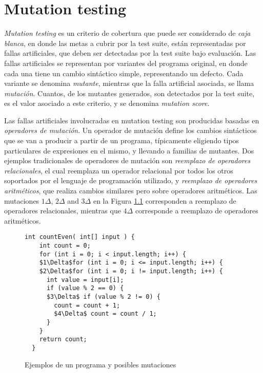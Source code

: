 \chapter[Mutation]{Mutation testing}
\label{cap:preliminares.mutation}

\emph{Mutation testing} es un criterio de cobertura que puede ser considerado de \emph{caja blanca}, en donde las metas a cubrir por la test suite, est\'an representadas por fallas artificiales, que deben ser detectadas por la test suite bajo evaluaci\'on. Las fallas artificiales se representan por variantes del programa original, en donde cada una tiene un cambio sint\'actico simple, representando un defecto. Cada variante se denomina \emph{mutante}, mientras que la falla artificial asociada, se llama \emph{mutaci\'on}. Cuantos, de los mutantes generados, son detectados por la test suite, es el valor asociado a este criterio, y se denomina \emph{mutation score}.

Las fallas artificiales involucradas en mutation testing son producidas basadas en \emph{operadores de mutaci\'on}. Un operador de mutaci\'on define los cambios sint\'acticos que se van a producir a partir de un programa, t\'ipicamente eligiendo tipos particulares de expresiones en el mismo, y llevando a familias de mutantes. Dos ejemplos tradicionales de operadores de mutaci\'on son \emph{reemplazo de operadores relacionales}, el cual reemplaza un operador relacional por todos los otros soportados por el lenguaje de programaci\'on utilizado, y \emph{reemplazo de operadores aritm\'eticos}, que realiza cambios similares pero sobre operadores aritm\'eticos. Las mutaciones $1\Delta$, $2\Delta$ and $3\Delta$ en la Figura \ref{figures.examples.mutations} corresponden a reemplazo de operadores relacionales, mientras que $4\Delta$ corresponde a reemplazo de operadores aritm\'eticos.

\begin{figure}[t]
	\begin{lstlisting}[frame=tlrb, mathescape=true]
  int countEven( int[] input ) {
    int count = 0;
    for (int i = 0; i < input.length; i++) {
    $1\Delta$for (int i = 0; i <= input.length; i++) {
    $2\Delta$for (int i = 0; i != input.length; i++) {
      int value = input[i];
      if (value % 2 == 0) {
      $3\Delta$ if (value % 2 != 0) {
        count = count + 1;
        $4\Delta$ count = count / 1;
      }
    }
    return count;
  }
	\end{lstlisting}
	\caption{Ejemplos de un programa y posibles mutaciones}
	\label{figures.examples.mutations}
\end{figure}

